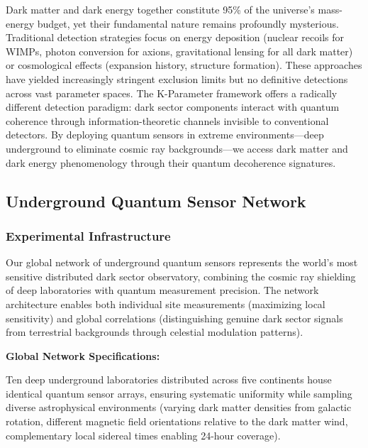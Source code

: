 \documentclass[11pt,a4paper,twoside]{article}
\begin{document}
Dark matter and dark energy together constitute 95\% of the universe's mass-energy budget, yet their fundamental nature remains profoundly mysterious. Traditional detection strategies focus on energy deposition (nuclear recoils for WIMPs, photon conversion for axions, gravitational lensing for all dark matter) or cosmological effects (expansion history, structure formation). These approaches have yielded increasingly stringent exclusion limits but no definitive detections across vast parameter spaces. The K-Parameter framework offers a radically different detection paradigm: dark sector components interact with quantum coherence through information-theoretic channels invisible to conventional detectors. By deploying quantum sensors in extreme environments---deep underground to eliminate cosmic ray backgrounds---we access dark matter and dark energy phenomenology through their quantum decoherence signatures.

\subsection{Underground Quantum Sensor Network}

\subsubsection{Experimental Infrastructure}

Our global network of underground quantum sensors represents the world's most sensitive distributed dark sector observatory, combining the cosmic ray shielding of deep laboratories with quantum measurement precision. The network architecture enables both individual site measurements (maximizing local sensitivity) and global correlations (distinguishing genuine dark sector signals from terrestrial backgrounds through celestial modulation patterns).

\textbf{Global Network Specifications:}

Ten deep underground laboratories distributed across five continents house identical quantum sensor arrays, ensuring systematic uniformity while sampling diverse astrophysical environments (varying dark matter densities from galactic rotation, different magnetic field orientations relative to the dark matter wind, complementary local sidereal times enabling 24-hour coverage).
\end{document}
